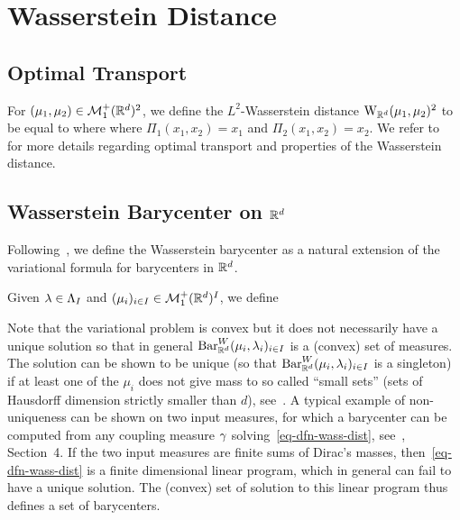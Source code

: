 \section{Wasserstein Distance}
\label{sec-bary-wass}


\subsection{Optimal Transport}

For $(\mu_1,\mu_2) \in \mathcal{M}_1^+(\mathbb{R}^d)^2$, we define the $L^2$-Wasserstein distance $\text{\upshape W}_{\mathbb{R}^d}(\mu_1,\mu_2)^2$ to be equal to
where 
where $\Pi_1(x_1,x_2) = x_1$ and $\Pi_2(x_1,x_2)=x_2$. We refer to~\cite{Villani03} for more details regarding optimal transport and properties of the Wasserstein distance.

\subsection{Wasserstein Barycenter on $\mathbb{R}^d$}


Following~\cite{Carlier_wasserstein_barycenter}, we define the Wasserstein barycenter as a natural extension of the variational formula for barycenters in $\mathbb{R}^d$.

\begin{defn}\label{defn-wass-baryc} Given $\lambda \in \Lambda_I$ and $(\mu_i)_{i \in I} \in \mathcal{M}_1^+(\mathbb{R}^d)^I$, we define
\end{defn}

Note that the variational problem is convex but it does not necessarily have a unique solution so that in general $\text{\upshape Bar}_{\mathbb{R}^d}^W(\mu_i,\lambda_i)_{i \in I}$ is a (convex) set of measures. The solution can be shown to be unique (so that $\text{\upshape Bar}_{\mathbb{R}^d}^W(\mu_i,\lambda_i)_{i \in I}$ is a singleton) if at least one of the $\mu_i$ does not give mass to so called ``small sets'' (sets of Hausdorff dimension strictly smaller than $d$), see~\cite{Carlier_wasserstein_barycenter}.  A typical example of non-uniqueness can be shown on two input measures, for which a barycenter can be computed from any coupling measure $\gamma$ solving~\eqref{eq-dfn-wass-dist}, see~\cite{Carlier_wasserstein_barycenter}, Section~4. If the two input measures are finite sums of Dirac's masses, then~\eqref{eq-dfn-wass-dist} is a finite dimensional linear program, which in general can fail to have a unique solution. The (convex) set of solution to this linear program thus defines a set of barycenters. 




